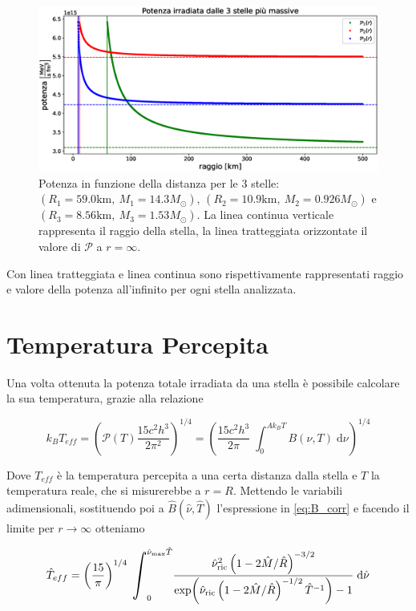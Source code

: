 \documentclass[a4paper, titlepage]{article}
\def\scaleint#1{\vcenter{\hbox{\scaleto[3ex]{\displaystyle\int}{#1}}}}
\begin{document}
\begin{figure}[h]
    \centering
    \includegraphics[width = \textwidth]{Figures/Pot.eps}
    \caption{Potenza in funzione della distanza per le 3 stelle: $(R_1 = 59.0 \unit{\kilo\meter},~M_1 = 14.3 M_\odot)$, $(R_2 = 10.9 \unit{\kilo\meter},~M_2 = 0.926 M_\odot)$ e $(R_3 = 8.56 \unit{\kilo\meter},~M_3 = 1.53 M_\odot)$.
    La linea continua verticale rappresenta il raggio della stella, la linea tratteggiata orizzontate il valore di $\mathcal{P}$ a $r = \infty$.}
    \label{fig:Poi}
\end{figure}

Con linea tratteggiata e linea continua sono rispettivamente rappresentati raggio e valore della potenza all'infinito per ogni stella analizzata.



\newpage
\section{Temperatura Percepita}

Una volta ottenuta la potenza totale irradiata da una stella è possibile calcolare la sua temperatura, grazie alla relazione

\begin{equation}
    k_B T_{eff} = \left( \mathcal{P} (T) \frac{15 c^2 h^3}{2 \pi^2} \right)^{1/4}
    = \left(\frac{15 c^2 h^3}{2 \pi} \; \int_0^{A k_B T} B(\nu, T) \; \mathrm{d}\nu \right)^{1/4}
    \label{eq:Teff}
\end{equation}

Dove $T_{eff}$ è la temperatura percepita a una certa distanza dalla stella e $T$ la temperatura reale, che si misurerebbe a $r = R$.
Mettendo le variabili adimensionali, sostituendo poi a $\hat B(\hat \nu, \hat T)$ l'espressione in \ref{eq:B_corr} e facendo il limite per $r \to \infty$ otteniamo

\begin{equation}
    \hat T_{eff} = \left( \frac{15}{\pi} \right)^{1/4} \;
    \scaleint{10ex}_0^{\hat \nu_\text{max} \hat T}
    \frac{\hat \nu_\text{ric}^2 \left(1 - 2 \hat M / \hat R \right)^{-3/2} }
    {\exp(\hat \nu_\text{ric} \left(1 - 2 \hat M / \hat R \right)^{-1/2} \hat T^{-1} ) - 1} \;
    \mathrm{d}\hat \nu
    \label{eq:Teff}
\end{equation}
\end{document}
